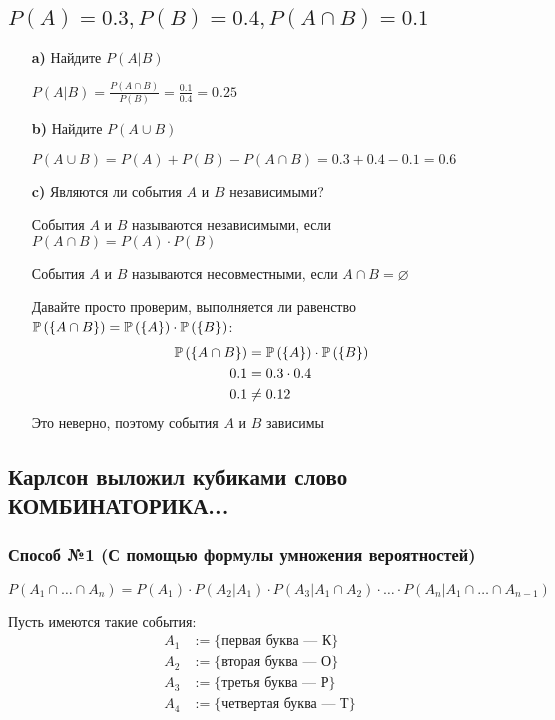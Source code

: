 \documentclass{article}
\begin{document}
\subsection{$P(A)=0.3,P(B)=0.4,P(A\cap B)=0.1$}
\begin{enumerate}
    \item[\textbf{a)}] Найдите $P(A|B)$
    
    $P(A|B)=\displaystyle\frac{P(A\cap B)}{P(B)}=\frac{0.1}{0.4}=0.25$
    \item[\textbf{b)}] Найдите $P(A\cup B)$
    
    $P(A\cup B)=P(A)+P(B)-P(A\cap B)=0.3+0.4-0.1=0.6$
    \item[\textbf{c)}] Являются ли события $A$ и $B$ независимыми?

     События $A$ и $B$ называются независимыми, если $P(A\cap B)=P(A)\cdot P(B)$

     События $A$ и $B$ называются несовместными, если $A\cap B=\varnothing$

    Давайте просто проверим, выполняется ли равенство $\mathbb{P}\left(\{A\cap B\}\right)=\mathbb{P}\left(\{A\}\right)\cdot\mathbb{P}\left(\{B\}\right)$:
    $$\begin{aligned}
        \mathbb{P}\left(\{A\cap B\}\right)&=\mathbb{P}\left(\{A\}\right)\cdot\mathbb{P}\left(\{B\}\right)\\
        0.1&=0.3\cdot0.4\\
        0.1&\ne0.12
    \end{aligned}$$
    Это неверно, поэтому события $A$ и $B$ зависимы

\end{enumerate}

\subsection{Карлсон выложил кубиками слово КОМБИНАТОРИКА...}
\subsubsection*{Способ №1 (С помощью формулы умножения вероятностей)}
$P(A_1\cap \ldots \cap A_n)=P(A_1)\cdot P(A_2|A_1)\cdot P(A_3|A_1\cap A_2)\cdot\ldots\cdot P(A_n|A_1\cap\ldots\cap A_{n-1})$



Пусть имеются такие события: \begin{equation*}
    \begin{aligned}
        A_1&:=\{\text{первая буква — К}\}\\
        A_2&:=\{\text{вторая буква — О}\}\\
        A_3&:=\{\text{третья буква — Р}\}\\
        A_4&:=\{\text{четвертая буква — Т}\}
    \end{aligned}
\end{equation*}
\end{document}
